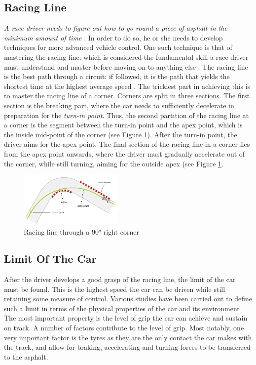 \documentclass{sig-alternate}
\begin{document}
{\subsection{Racing Line}
\emph{A race driver needs to figure out how to go round a piece of asphalt in the minimum amount of time} \cite{GoingFaster}. In order to do so, he or she needs to develop techniques for more advanced vehicle control. One such technique is that of mastering the racing line, which is considered the fundamental skill a race driver must understand and master before moving on to anything else \cite{GoingFaster}. The racing line is the best path through a circuit: if followed, it is the path that yields the shortest time at the highest average speed \cite{beckman1991physics}. The trickiest part in achieving this is to master the racing line of a corner. Corners are split in three sections. The first section is the breaking part, where the car needs to sufficiently decelerate in preparation for the  \emph{turn-in point}. Thus, the second partition of the racing line at a corner is the segment between the turn-in point and the apex point, which is the inside mid-point of the corner (see Figure \ref{fig:CornerRaceLine}). After the turn-in point, the driver aims for the apex point. The final section of the racing line in a corner lies from the apex point onwards, where the driver must gradually accelerate out of the corner, while still turning, aiming for the outside apex (see Figure \ref{fig:CornerRaceLine}.

\begin{figure}[!htb]
	\centering
	\includegraphics[width=0.45\textwidth]{images/cornerraceline}
	\caption{Racing line through a 90" right corner}
	\label{fig:CornerRaceLine}
\end{figure}

\subsection{Limit Of The Car}
After the driver develops a good grasp of the racing line, the limit of the car must be found. This is the highest speed the car can be driven while still retaining some measure of control. Various studies have been carried out to define such a limit in terms of the physical properties of the car and its environment \cite{beckman1991physics}. The most important property is the level of grip the car can achieve and sustain on track. A number of factors contribute to the level of grip. Most notably, one very important factor is the tyres as they are the only contact the car makes with the track, and allow for braking, accelerating and turning forces to be transferred to the asphalt.

}
\end{document}
